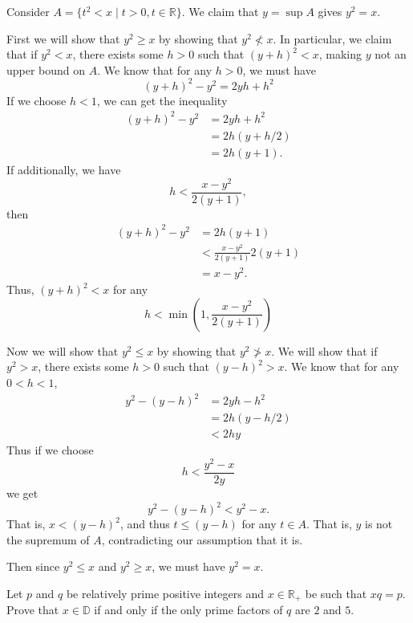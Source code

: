\documentclass[12 pt, letterpaper]{hmcpset}
\begin{document}
\begin{solution}
	Consider $A = \{ t^{2} < x \mid t > 0, t \in \mathbb{R} \}$. We claim that $y = \sup A$ gives $y^{2} = x$.

	First we will show that $y^{2} \ge x$ by showing that $y^{2} \not < x$. In particular, we claim that if $y^{2} < x$, there exists some $h > 0$ such that $(y + h)^{2} < x$, making $y$ not an upper bound on $A$. We know that for any $h > 0$, we must have
	\[
		(y + h)^{2} - y^{2} = 2 y h + h^{2}
	\]
	If we choose $h < 1$, we can get the inequality
	\[
		\begin{split}
			(y + h)^{2} - y^{2} & = 2 y h + h^{2} \\
					    & = 2 h (y + h/2) \\
					    & = 2 h (y + 1).
		\end{split}
	\]
	If additionally, we have
	\[
		h < \frac{x - y^{2}}{2(y + 1)},
	\]
	then
	\[
		\begin{split}
			(y + h)^{2} - y^{2} & = 2 h (y + 1) \\
					    & < \frac{x - y^{2}}{2 (y + 1)} 2 (y + 1) \\
					    & = x - y^{2}.
		\end{split}
	\]
	Thus, $(y + h)^{2} < x$ for any
	\[
		h < \min \left ( 1, \frac{x - y^{2}}{2(y + 1)} \right )
	\]

	Now we will show that $y^{2} \le x$ by showing that $y^{2} \not > x$. We will show that if $y^{2} > x$, there exists some $h > 0$ such that $(y - h)^{2} > x$. We know that for any $0 < h < 1$,
	\[
		\begin{split}
			y^{2} - (y - h)^{2} & = 2yh - h^{2} \\
					    & = 2h(y - h/2) \\
					    & < 2hy 
		\end{split}
	\]
	Thus if we choose
	\[
		h < \frac{y^{2} - x}{2y}
	\]
	we get
	\[
		y^{2} - (y - h)^{2} < y^{2} - x.
	\]
	That is, $x < (y - h)^{2}$, and thus  $t \le (y - h)$ for any $t \in A$. That is, $y$ is not the supremum of $A$, contradicting our assumption that it is.

	Then since $y^{2} \le x$ and $y^{2} \ge x$, we must have $y^{2} = x$.
\end{solution}

\pagebreak

\begin{problem}[3.]
	Let $p$ and $q$ be relatively prime positive integers and $x \in \mathbb{R}_{+}$ be such that $xq = p$. Prove that $x \in \mathbb{D}$ if and only if the only prime factors of $q$ are $2$ and $5$.
\end{problem}
\end{document}

